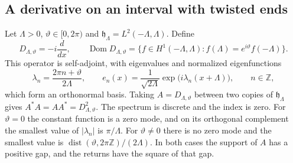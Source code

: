 \subsection{A derivative on an interval with twisted ends}
\label{subsec:four-maps-interval}

Let $\Lambda>0$, $\vartheta\in[0,2\pi)$ and $\mathfrak h_\Lambda=L^2(-\Lambda,\Lambda)$. Define
\begin{equation}
 D_{\Lambda,\vartheta}=-i\frac{d}{dx},\qquad
 \operatorname{Dom}D_{\Lambda,\vartheta}=\bigl\{f\in H^1(-\Lambda,\Lambda):f(\Lambda)=e^{i\vartheta}f(-\Lambda)\bigr\}.
 \label{eq:four-maps-interval-operator}
\end{equation}
This operator is self-adjoint, with eigenvalues and normalized eigenfunctions
\begin{equation}
 \lambda_n=\frac{2\pi n+\vartheta}{2\Lambda},\qquad
 e_n(x)=\frac{1}{\sqrt{2\Lambda}}\exp\bigl(i\lambda_n(x+\Lambda)\bigr),\qquad n\in\mathbb Z ,
 \label{eq:four-maps-interval-spectrum}
\end{equation}
which form an orthonormal basis. Taking $A=D_{\Lambda,\vartheta}$ between two copies of $\mathfrak h_\Lambda$ gives $A^*A=AA^*=D_{\Lambda,\vartheta}^2$. The spectrum is discrete and the index is zero. For $\vartheta=0$ the constant function is a zero mode, and on its orthogonal complement the smallest value of $|\lambda_n|$ is $\pi/\Lambda$. For $\vartheta\ne0$ there is no zero mode and the smallest value is $\operatorname{dist}(\vartheta,2\pi\mathbb Z)/(2\Lambda)$. In both cases the support of $A$ has a positive gap, and the returns have the square of that gap.

